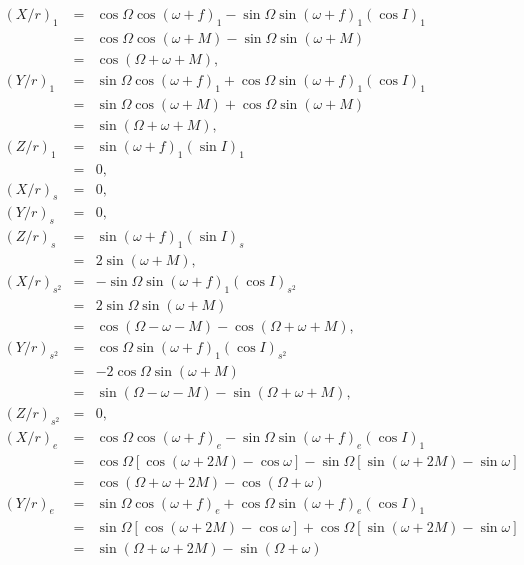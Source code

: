 \documentclass [12pt, a4paper] {article}
\begin{document}
\begin {eqnarray}
    (X/r)_1 &=& \cos\Omega\cos(\omega + f)_1  - \sin\Omega\sin(\omega + f)_1(\cos I)_1
    \\
    &=& \cos\Omega\cos(\omega + M)  - \sin\Omega\sin(\omega + M)
    \\
    &=& 
    \cos(\Omega + \omega + M),
    \\
    (Y/r)_1 &=& \sin\Omega\cos(\omega + f)_1  + \cos\Omega\sin(\omega + f)_1(\cos I)_1
    \\
    &=& 
    \sin\Omega\cos(\omega + M) + \cos\Omega\sin(\omega + M)
    \\
    &=& 
    \sin(\Omega + \omega + M),
    \\
    (Z/r)_1 &=& \sin(\omega + f)_1 (\sin I)_1 
    \\
    &=& 0, 
    \\
    (X/r)_s &=& 0, 
    \\
    (Y/r)_s &=& 0,
    \\
    (Z/r)_s &=& \sin(\omega + f)_1(\sin I)_s
    \\
    &=& 
    2\sin(\omega + M),
    \\
    (X/r)_{s^2} &=& -\sin\Omega\sin(\omega + f)_1(\cos I)_{s^2}
    \\
    &=& 2\sin\Omega\sin(\omega + M)
    \\
    &=&
    \cos(\Omega - \omega - M) - \cos(\Omega + \omega + M),
    \\
    (Y/r)_{s^2} &=& \cos\Omega\sin(\omega + f)_1(\cos I)_{s^2}
    \\
    &=& 
    -2\cos\Omega\sin(\omega + M)
    \\
    &=&
    \sin(\Omega - \omega - M) - \sin(\Omega + \omega + M),
    \\
    (Z/r)_{s^2} &=& 0,
    \\
    (X/r)_{e} &=&
    \cos\Omega\cos(\omega + f)_e - \sin\Omega\sin(\omega + f)_e(\cos I)_1
    \\
    &=& 
    \cos\Omega[\cos(\omega + 2M) - \cos\omega]
    -
    \sin\Omega[\sin(\omega + 2M) - \sin\omega]
    \\
    &=& 
    \cos(\Omega + \omega + 2M) - \cos(\Omega + \omega)
    \\
    (Y/r)_{e} &=&
    \sin\Omega\cos(\omega + f)_e + \cos\Omega\sin(\omega + f)_e(\cos I)_1
    \\
    &=&
    \sin\Omega[\cos(\omega + 2M) - \cos\omega]
    +
    \cos\Omega[\sin(\omega + 2M) - \sin\omega]
    \\
    &=& 
    \sin(\Omega + \omega + 2M) - \sin(\Omega + \omega)

\end{eqnarray}
\end{document}
